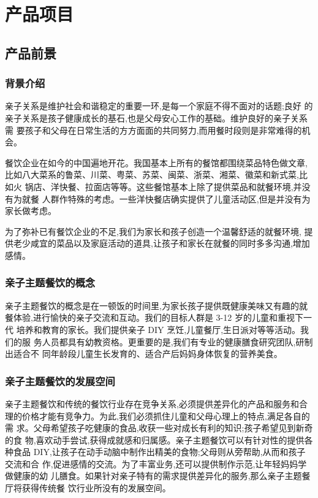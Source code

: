 \chapter{产品项目}

\section{产品前景}

\subsection{背景介绍}
亲子关系是维护社会和谐稳定的重要一环,是每一个家庭不得不面对的话题;良好
的亲子关系是孩子健康成长的基石,也是父母安心工作的基础。维护良好的亲子关系需
要孩子和父母在日常生活的方方面面的共同努力,而用餐时段则是非常难得的机会。

餐饮企业在如今的中国遍地开花。我国基本上所有的餐馆都围绕菜品特色做文章,
比如八大菜系的鲁菜、川菜、粤菜、苏菜、闽菜、浙菜、湘菜、徽菜和新式菜,比如火
锅店、洋快餐、拉面店等等。这些餐馆基本上除了提供菜品和就餐环境,并没有为就餐
人群作特殊的考虑。一些洋快餐店确实提供了儿童活动区,但是并没有为家长做考虑。

为了弥补已有餐饮企业的不足,我们为家长和孩子创造一个温馨舒适的就餐环境,
提供老少咸宜的菜品以及家庭活动的道具,让孩子和家长在就餐的同时多多沟通,增加
感情。

\subsection{亲子主题餐饮的概念}
亲子主题餐饮的概念是在一顿饭的时间里,为家长孩子提供既健康美味又有趣的就
餐体验,进行愉快的亲子交流和互动。我们的目标人群是 3-12 岁的儿童和重视下一代
培养和教育的家长。我们提供亲子 DIY 烹饪,儿童餐厅,生日派对等等活动。我们的服
务人员都具有幼教资格。更重要的是,我们有专业的健康膳食研究团队,研制出适合不
同年龄段儿童生长发育的、适合产后妈妈身体恢复的营养美食。

\subsection{亲子主题餐饮的发展空间}
亲子主题餐饮和传统的餐饮行业存在竞争关系,必须提供差异化的产品和服务和合
理的价格才能有竞争力。为此,我们必须抓住儿童和父母心理上的特点,满足各自的需
求。父母希望孩子吃健康的食品,收获一些对成长有利的知识;孩子希望见到新奇的食
物,喜欢动手尝试,获得成就感和归属感。亲子主题餐饮可以有针对性的提供各种食品
DIY,让孩子在动手动脑中制作出精美的食物;父母则从旁帮助,从而和孩子交流和合
作,促进感情的交流。为了丰富业务,还可以提供制作示范,让年轻妈妈学做健康的幼
儿膳食。如果针对亲子特有的需求提供差异化的服务,那么亲子主题餐厅将获得传统餐
饮行业所没有的发展空间。

